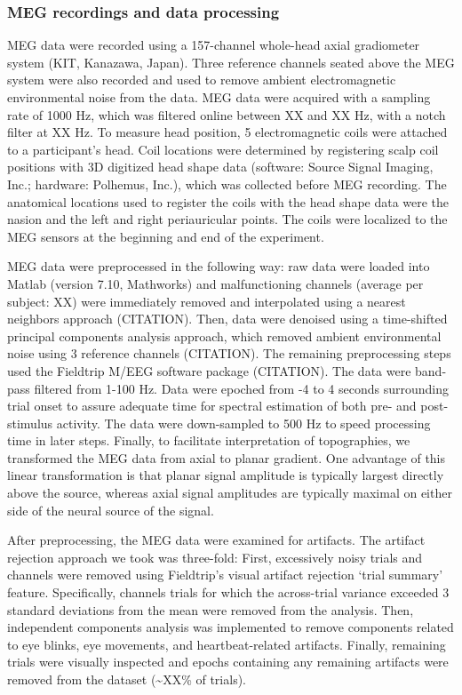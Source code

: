 \subsubsection{MEG recordings and data
processing}\label{meg-recordings-and-data-processing}

MEG data were recorded using a 157-channel whole-head axial gradiometer
system (KIT, Kanazawa, Japan). Three reference channels seated above the
MEG system were also recorded and used to remove ambient electromagnetic
environmental noise from the data. MEG data were acquired with a
sampling rate of 1000 Hz, which was filtered online between XX and XX
Hz, with a notch filter at XX Hz. To measure head position, 5
electromagnetic coils were attached to a participant's head. Coil
locations were determined by registering scalp coil positions with 3D
digitized head shape data (software: Source Signal Imaging, Inc.;
hardware: Polhemus, Inc.), which was collected before MEG recording. The
anatomical locations used to register the coils with the head shape data
were the nasion and the left and right periauricular points. The coils
were localized to the MEG sensors at the beginning and end of the
experiment.

MEG data were preprocessed in the following way: raw data were loaded
into Matlab (version 7.10, Mathworks) and malfunctioning channels
(average per subject: XX) were immediately removed and interpolated
using a nearest neighbors approach (CITATION). Then, data were denoised
using a time-shifted principal components analysis approach, which
removed ambient environmental noise using 3 reference channels
(CITATION). The remaining preprocessing steps used the Fieldtrip M/EEG
software package (CITATION). The data were band-pass filtered from 1-100
Hz. Data were epoched from -4 to 4 seconds surrounding trial onset to
assure adequate time for spectral estimation of both pre- and
post-stimulus activity. The data were down-sampled to 500 Hz to speed
processing time in later steps. Finally, to facilitate interpretation of
topographies, we transformed the MEG data from axial to planar gradient.
One advantage of this linear transformation is that planar signal
amplitude is typically largest directly above the source, whereas axial
signal amplitudes are typically maximal on either side of the neural
source of the signal.

After preprocessing, the MEG data were examined for artifacts. The
artifact rejection approach we took was three-fold: First, excessively
noisy trials and channels were removed using Fieldtrip's visual artifact
rejection `trial summary' feature. Specifically, channels trials for
which the across-trial variance exceeded 3 standard deviations from the
mean were removed from the analysis. Then, independent components
analysis was implemented to remove components related to eye blinks, eye
movements, and heartbeat-related artifacts. Finally, remaining trials
were visually inspected and epochs containing any remaining artifacts
were removed from the dataset (\textasciitilde{}XX\% of trials).


